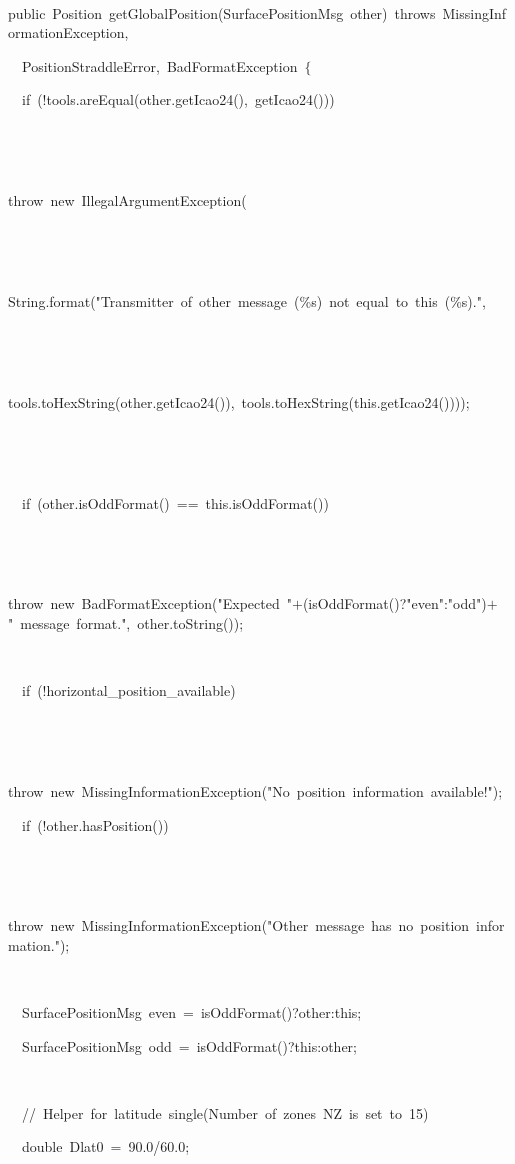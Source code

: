 {
\tt
{public\ Position\ getGlobalPosition(SurfacePositionMsg\ other)\ throws\ MissingInformationException,\ \leavevmode\par
{\ }\ PositionStraddleError,\ BadFormatException\ $\{$\leavevmode\par
{\ }\ if\ (!tools.areEqual(other.getIcao24(),\ getIcao24()))\leavevmode\par
{\ }}{\hlstd\ \ \ }{\hlstd throw\ new\ IllegalArgumentException(\leavevmode\par
{\ }}{\hlstd\ \ \ \ \ }{\hlstd String.format("Transmitter\ of\ other\ message\ (\%{}s)\ not\ equal\ to\ this\ (\%{}s).",\leavevmode\par
{\ }}{\hlstd\ \ \ \ \ }{\hlstd tools.toHexString(other.getIcao24()),\ tools.toHexString(this.getIcao24())));\leavevmode\par
{\ }}{\hlstd\ \ }{\hlstd \leavevmode\par
{\ }\ if\ (other.isOddFormat()\ $\mathord{=}$$\mathord{=}$\ this.isOddFormat())\leavevmode\par
{\ }}{\hlstd\ \ }{\hlstd throw\ new\ BadFormatException("Expected\ "$\mathord{+}$(isOddFormat()?"even":"odd")$\mathord{+}$"\ message\ format.",\ other.toString());\leavevmode\par
{\ }\leavevmode\par
{\ }\ if\ (!horizontal\_{}position\_{}available)\leavevmode\par
{\ }}{\hlstd\ \ }{\hlstd throw\ new\ MissingInformationException("No\ position\ information\ available!");\leavevmode\par
{\ }\ if\ (!other.hasPosition())\leavevmode\par
{\ }}{\hlstd\ \ }{\hlstd throw\ new\ MissingInformationException("Other\ message\ has\ no\ position\ information.");\leavevmode\par
{\ }\leavevmode\par
{\ }\ SurfacePositionMsg\ even\ $\mathord{=}$\ isOddFormat()?other:this;\leavevmode\par
{\ }\ SurfacePositionMsg\ odd\ $\mathord{=}$\ isOddFormat()?this:other;\leavevmode\par
{\ }\leavevmode\par
{\ }\ //\ Helper\ for\ latitude\ single(Number\ of\ zones\ NZ\ is\ set\ to\ 15)\leavevmode\par
{\ }\ double\ Dlat0\ $\mathord{=}$\ 90.0/60.0;\leavevmode\par
}}
